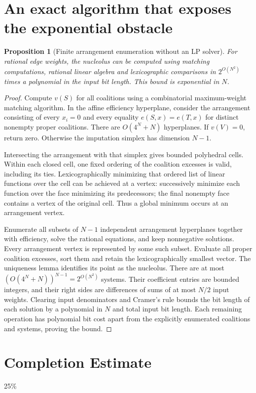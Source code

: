 \documentclass[11pt,a4paper]{article}
\newtheorem{proposition}[theorem]{Proposition}
\theoremstyle{definition}
\theoremstyle{remark}
\begin{document}
\section{An exact algorithm that exposes the exponential obstacle}
\begin{proposition}[Finite arrangement enumeration without an LP solver]
For rational edge weights, the nucleolus can be computed using matching computations, rational linear algebra and lexicographic comparisons in $2^{O(N^2)}$ times a polynomial in the input bit length. This bound is exponential in $N$.
\end{proposition}
\begin{proof}
Compute $v(S)$ for all coalitions using a combinatorial maximum-weight matching algorithm. In the affine efficiency hyperplane, consider the arrangement consisting of every $x_i=0$ and every equality $e(S,x)=e(T,x)$ for distinct nonempty proper coalitions. There are $O(4^N+N)$ hyperplanes. If $v(V)=0$, return zero. Otherwise the imputation simplex has dimension $N-1$.

Intersecting the arrangement with that simplex gives bounded polyhedral cells. Within each closed cell, one fixed ordering of the coalition excesses is valid, including its ties. Lexicographically minimizing that ordered list of linear functions over the cell can be achieved at a vertex: successively minimize each function over the face minimizing its predecessors; the final nonempty face contains a vertex of the original cell. Thus a global minimum occurs at an arrangement vertex.

Enumerate all subsets of $N-1$ independent arrangement hyperplanes together with efficiency, solve the rational equations, and keep nonnegative solutions. Every arrangement vertex is represented by some such subset. Evaluate all proper coalition excesses, sort them and retain the lexicographically smallest vector. The uniqueness lemma identifies its point as the nucleolus. There are at most $(O(4^N+N))^{N-1}=2^{O(N^2)}$ systems. Their coefficient entries are bounded integers, and their right sides are differences of sums of at most $N/2$ input weights. Clearing input denominators and Cramer's rule bounds the bit length of each solution by a polynomial in $N$ and total input bit length. Each remaining operation has polynomial bit cost apart from the explicitly enumerated coalitions and systems, proving the bound.
\end{proof}

\section{Completion Estimate}
25\%
\end{document}
